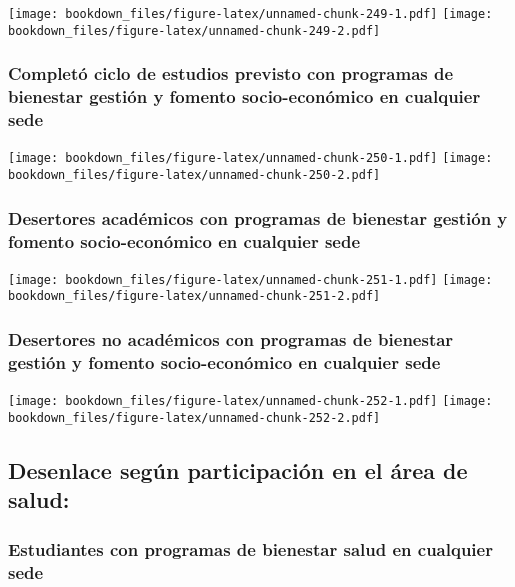 \documentclass[]{article}
\theoremstyle{definition}
\theoremstyle{definition}
\theoremstyle{definition}
\theoremstyle{remark}
\begin{document}
\texttt{[image: bookdown\_files/figure-latex/unnamed-chunk-249-1.pdf]}
\texttt{[image: bookdown\_files/figure-latex/unnamed-chunk-249-2.pdf]}

\subsubsection{Completó ciclo de estudios previsto con programas de
bienestar gestión y fomento socio-económico en cualquier
sede}\label{completo-ciclo-de-estudios-previsto-con-programas-de-bienestar-gestion-y-fomento-socio-economico-en-cualquier-sede-1}

\texttt{[image: bookdown\_files/figure-latex/unnamed-chunk-250-1.pdf]}
\texttt{[image: bookdown\_files/figure-latex/unnamed-chunk-250-2.pdf]}

\subsubsection{Desertores académicos con programas de bienestar gestión
y fomento socio-económico en cualquier
sede}\label{desertores-academicos-con-programas-de-bienestar-gestion-y-fomento-socio-economico-en-cualquier-sede-1}

\texttt{[image: bookdown\_files/figure-latex/unnamed-chunk-251-1.pdf]}
\texttt{[image: bookdown\_files/figure-latex/unnamed-chunk-251-2.pdf]}

\subsubsection{Desertores no académicos con programas de bienestar
gestión y fomento socio-económico en cualquier
sede}\label{desertores-no-academicos-con-programas-de-bienestar-gestion-y-fomento-socio-economico-en-cualquier-sede-1}

\texttt{[image: bookdown\_files/figure-latex/unnamed-chunk-252-1.pdf]}
\texttt{[image: bookdown\_files/figure-latex/unnamed-chunk-252-2.pdf]}

\subsection{Desenlace según participación en el área de
salud:}\label{desenlace-segun-participacion-en-el-area-de-salud-1}

\subsubsection{Estudiantes con programas de bienestar salud en cualquier
sede}\label{estudiantes-con-programas-de-bienestar-salud-en-cualquier-sede-1}
\end{document}
